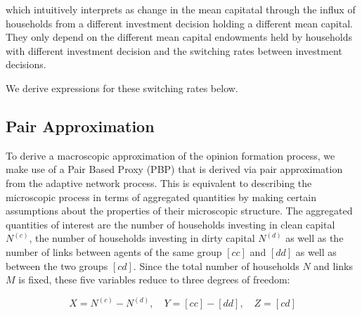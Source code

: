 which intuitively interprets as change in the mean capitatal through the influx of households from a different investment decision holding a different mean capital. They only depend on the different mean capital endowments held by households with different investment decision and the switching rates between investment decisions.

We derive expressions for these switching rates below.
\subsection{Pair Approximation}

To derive a macroscopic approximation of the opinion formation process, we make use of a Pair Based Proxy (PBP) that is derived via pair approximation from the adaptive network process. This is equivalent to describing the microscopic process in terms of aggregated quantities by making certain assumptions about the properties of their microscopic structure. The aggregated quantities of interest are the number of households investing in clean capital $N^{(c)}$, the number of households investing in dirty capital $N^{(d)}$ as well as the number of links between agents of the same group $[cc]$ and $[dd]$ as well as between the two groups $[cd]$. Since the total number of households $N$ and links $M$ is fixed, these five variables reduce to three degrees of freedom:

\begin{equation}
	X = N^{(c)} - N^{(d)}, \quad Y = [cc] - [dd], \quad Z = [cd]
	\label{eq:opinion_formation_macro_variables}
\end{equation}

